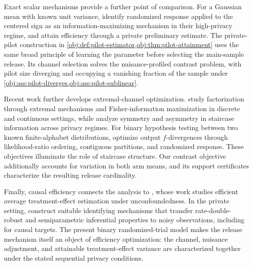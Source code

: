 \documentclass[11pt]{article}
\begin{document}
Exact scalar mechanisms provide a further point of comparison. For a Gaussian mean with known unit variance, \citet{KalininSteinberger2025} identify randomized response applied to the centered sign as an information-maximizing mechanism in their high-privacy regime, and attain efficiency through a private preliminary estimate. %
The private-pilot construction in \cref{obj:def:pilot-estimator,obj:thm:pilot-attainment} uses the same broad principle of learning the parameter before selecting the main-sample release. Its channel selection solves the nuisance-profiled contrast problem, with pilot size diverging and occupying a vanishing fraction of the sample under \cref{obj:ass:pilot-diverges,obj:ass:pilot-sublinear}.

Recent work further develops extremal-channel optimization. \citet{Amorino2025} study factorization through extremal mechanisms and Fisher-information maximization in discrete and continuous settings, while \citet{Amorino2026} analyze symmetry and asymmetry in staircase information across privacy regimes. %
For binary hypothesis testing between two known finite-alphabet distributions, \citet{GhaziNasserCalmonIssa2026} optimize output \(f\)-divergences through likelihood-ratio ordering, contiguous partitions, and randomized response. %
These objectives illuminate the role of staircase structure. Our contrast objective additionally accounts for variation in both arm means, and its support certificates characterize the resulting release cardinality.

Finally, causal efficiency connects the analysis to \citet{Hahn1998,Hirano2003}, whose work studies efficient average treatment-effect estimation under unconfoundedness. %
In the private setting, \citet{KormosVanderVaart2026} construct suitable identifying mechanisms that transfer rate-double-robust and semiparametric inferential properties to noisy observations, including for causal targets. %
The present binary randomized-trial model makes the release mechanism itself an object of efficiency optimization: the channel, nuisance adjustment, and attainable treatment-effect variance are characterized together under the stated sequential privacy conditions.
\end{document}
